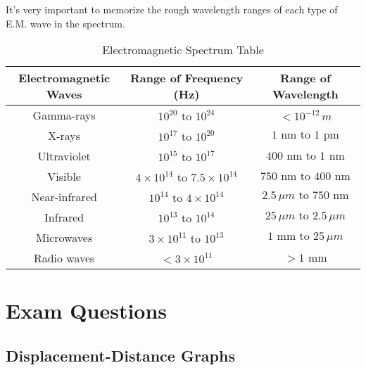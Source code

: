 \documentclass[a4paper,12pt]{article}
\let\oldsection\section
\renewcommand\section{\clearpage\oldsection}
\begin{document}
It's very important to memorize the rough wavelength ranges of each type of E.M. wave in the spectrum.
\begin{table}[h]
  \centering
  \renewcommand{\arraystretch}{2}
  \begin{tabular}{|c|c|c|}
    \hline
    \textbf{Electromagnetic Waves} & \textbf{Range of Frequency (Hz)}                    & \textbf{Range of Wavelength}                \\
    \hline
    Gamma-rays                     & \(10^{20} \text{ to } 10^{24}\)                     & \(< 10^{-12} \, m\)                         \\
    \hline
    X-rays                         & \(10^{17} \text{ to } 10^{20}\)                     & \(1 \text{ nm to } 1 \text{ pm}\)           \\
    \hline
    Ultraviolet                    & \(10^{15} \text{ to } 10^{17}\)                     & \(400 \text{ nm to } 1 \text{ nm}\)         \\
    \hline
    Visible                        & \(4 \times 10^{14} \text{ to } 7.5 \times 10^{14}\) & \(750 \text{ nm to } 400 \text{ nm}\)       \\
    \hline
    Near-infrared                  & \(10^{14} \text{ to } 4 \times 10^{14}\)            & \(2.5 \, \mu m \text{ to } 750 \text{ nm}\) \\
    \hline
    Infrared                       & \(10^{13} \text{ to } 10^{14}\)                     & \(25 \, \mu m \text{ to } 2.5 \, \mu m\)    \\
    \hline
    Microwaves                     & \(3 \times 10^{11} \text{ to } 10^{13}\)            & \(1 \text{ mm to } 25 \, \mu m\)            \\
    \hline
    Radio waves                    & \(< 3 \times 10^{11}\)                              & \(> 1 \text{ mm}\)                          \\
    \hline
  \end{tabular}
  \caption{Electromagnetic Spectrum Table}
  \label{tab:em_spectrum}
\end{table}

\pagebreak

\section{Exam Questions}

\subsection{Displacement-Distance Graphs}
\end{document}
